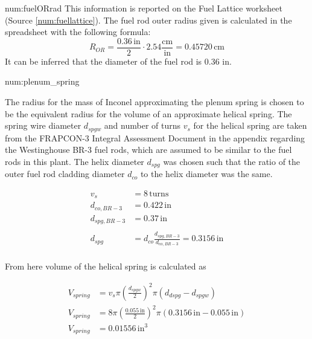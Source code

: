 \begin{numitem}{num:fuelORrad}
  This information is reported on the Fuel Lattice worksheet (Source \ref{num:fuellattice}). The fuel rod outer radius given is calculated in the spreadsheet with the following formula:
\[
    R_{OR} = \frac{0.36\,\mathrm{in}}{2}\cdot 2.54 \mathrm{\frac{cm}{in}} = 0.45720\,\mathrm{cm}
\]
  It can be inferred that the diameter of the fuel rod is 0.36 in.
  
\end{numitem}

\begin{numitem}{num:plenum_spring}

  The radius for the mass of Inconel approximating the plenum spring is chosen
  to be the equivalent radius for the volume of an approximate helical spring.
  The spring wire diameter $d_{spgw}$ and number of turns $v_s$ for the helical
  spring are taken from the FRAPCON-3 Integral Assessment Document in the
  appendix regarding the Westinghouse BR-3 fuel rods, which are assumed to be
  similar to the fuel rods in this plant. The helix diameter $d_{spg}$ was
  chosen such that the ratio of the outer fuel rod cladding diameter $d_{co}$ to the
  helix diameter was the same.
  
\[
  \begin{aligned}
    v_s &= 8\,\mathrm{turns} \\
    d_{co,BR-3} &= 0.422\,\mathrm{in} \\
    d_{spg,BR-3} &= 0.37\,\mathrm{in} \\
    \\
    d_{spg} &= d_{co}\frac{d_{spg,BR-3}}{d_{co,BR-3}} = 0.3156\,\mathrm{in} \\
  \end{aligned}
\]

  From here volume of the helical spring is calculated as
  
\[
  \begin{aligned}
    V_{spring} &= v_s \pi \left(\frac{d_{spgw}}{2}\right)^2 \pi \left(d_{dspg}-d_{spgw}\right) \\
    V_{spring} &= 8 \pi \left(\frac{0.055\,\mathrm{in}}{2}\right)^2 \pi (0.3156\,\mathrm{in}-0.055\,\mathrm{in}) \\
    V_{spring} &= 0.01556\,\mathrm{in}^3
  \end{aligned}
\]


\end{numitem}
